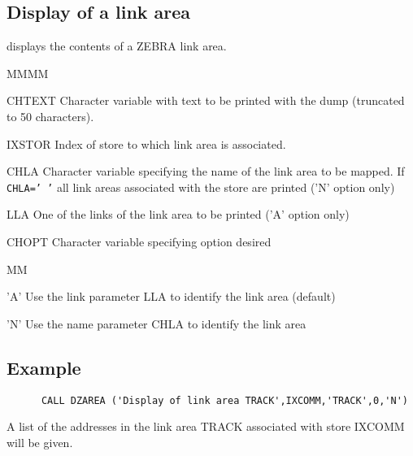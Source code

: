 \subsection{Display of a link area}
\par {} displays the contents of a ZEBRA link area.
\Idesc
\begin{DL}{MMMM}
\item[CHTEXT]Character variable with text to be printed with the
dump (truncated to 50 characters).
\item[IXSTOR]Index of store to which link area is associated.
\item[CHLA]Character variable specifying the name of the link area to be mapped.
\newline If {\tt CHLA=' '} all link areas associated with the store are printed
('N' option only)
\item[LLA]One of the links of the link area to be printed ('A' option only)
\item[CHOPT]Character variable specifying option desired
\begin{DL}{MM}
\item['A']Use the link parameter LLA to identify the link area (default)
\item['N']Use the name parameter CHLA to identify the link area
\end{DL}
\end{DL}
\subsection{Example}
\begin{verbatim}
      CALL DZAREA ('Display of link area TRACK',IXCOMM,'TRACK',0,'N')
\end{verbatim}
A list of the addresses in the link area TRACK associated
with store IXCOMM will be given.
